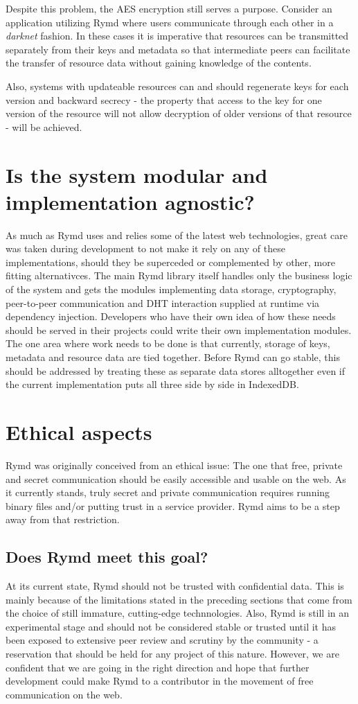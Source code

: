 Despite this problem, the AES encryption still serves a purpose. Consider an application utilizing Rymd where users communicate through each other in a \emph{darknet} fashion. In these cases it is imperative that resources can be transmitted separately from their keys and metadata so that intermediate peers can facilitate the transfer of resource data without gaining knowledge of the contents.

Also, systems with updateable resources can and should regenerate keys for each version and backward secrecy - the property that access to the key for one version of the resource will not allow decryption of older versions of that resource - will be achieved.

\section{Is the system modular and implementation agnostic?}
As much as Rymd uses and relies some of the latest web technologies, great care was taken during development to not make it rely on any of these implementations, should they be superceded or complemented by other, more fitting alternativces. The main Rymd library itself handles only the business logic of the system and gets the modules implementing data storage, cryptography, peer-to-peer communication and DHT interaction supplied at runtime via dependency injection. Developers who have their own idea of how these needs should be served in their projects could write their own implementation modules. The one area where work needs to be done is that currently, storage of keys, metadata and resource data are tied together. Before Rymd can go stable, this should be addressed by treating these as separate data stores alltogether even if the current implementation puts all three side by side in IndexedDB.

\section{Ethical aspects}
Rymd was originally conceived from an ethical issue: The one that free, private and secret communication should be easily accessible and usable on the web. As it currently stands, truly secret and private communication requires running binary files and/or putting trust in a service provider. Rymd aims to be a step away from that restriction.

\subsection{Does Rymd meet this goal?}
At its current state, Rymd should not be trusted with confidential data. This is mainly because of the limitations stated in the preceding sections that come from the choice of still immature, cutting-edge technnologies. Also, Rymd is still in an experimental stage and should not be considered stable or trusted until it has been exposed to extensive peer review and scrutiny by the community - a reservation that should be held for any project of this nature. However, we are confident that we are going in the right direction and hope that further development could make Rymd to a contributor in the movement of free communication on the web.

